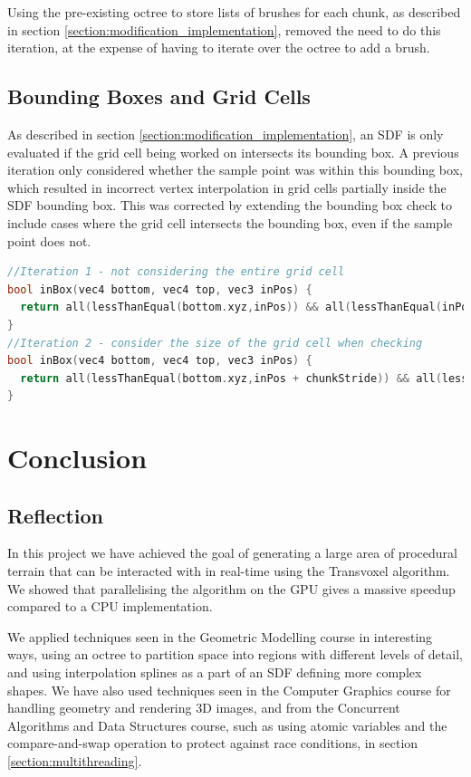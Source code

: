 \documentclass[11pt]{article}
\begin{document}
Using the pre-existing octree to store lists of brushes for each chunk, as described in section \ref{section:modification_implementation}, removed the need to do this iteration, at the expense of having to iterate over the octree to add a brush.

\subsection{Bounding Boxes and Grid Cells}
As described in section \ref{section:modification_implementation}, an SDF is only evaluated if the grid cell being worked on intersects its bounding box. A previous iteration only considered whether the sample point was within this bounding box, which resulted in incorrect vertex interpolation in grid cells partially inside the SDF bounding box. This was corrected by extending the bounding box check to include cases where the grid cell intersects the bounding box, even if the sample point does not.

\begin{lstlisting}[language=C++,label={bb_gc},caption={Different iterations of the SDF bounding box check.}]
//Iteration 1 - not considering the entire grid cell
bool inBox(vec4 bottom, vec4 top, vec3 inPos) {
  return all(lessThanEqual(bottom.xyz,inPos)) && all(lessThanEqual(inPos,top.xyz));
}
//Iteration 2 - consider the size of the grid cell when checking
bool inBox(vec4 bottom, vec4 top, vec3 inPos) {
  return all(lessThanEqual(bottom.xyz,inPos + chunkStride)) && all(lessThanEqual(inPos - chunkStride,top.xyz));
}
\end{lstlisting}
  
\section{Conclusion}
\subsection{Reflection}
In this project we have achieved the goal of generating a large area of procedural terrain that can be interacted with in real-time using the Transvoxel algorithm. We showed that parallelising the algorithm on the GPU gives a massive speedup compared to a CPU implementation.

We applied techniques seen in the Geometric Modelling course in interesting ways, using an octree to partition space into regions with different levels of detail, and using interpolation splines as a part of an SDF defining more complex shapes. 
We have also used techniques seen in the Computer Graphics course for handling geometry and rendering 3D images, and from the Concurrent Algorithms and Data Structures course, such as using atomic variables and the compare-and-swap operation to protect against race conditions, in section \ref{section:multithreading}.
\end{document}

